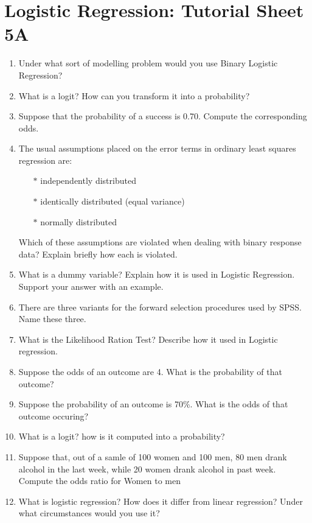 \documentclass[a4paper,12pt]{article}
\begin{document}
	\section*{Logistic Regression: Tutorial Sheet 5A}
\begin{enumerate}
	
	\item 
Under what sort of modelling problem would you use Binary Logistic Regression?

	\item What is a logit? How can you transform it into a probability?
	\item Suppose that the probability of a success is 0.70. Compute the corresponding odds.
	\item The usual assumptions placed on the error terms in ordinary least squares
	regression are:
	\begin{itemize}
		\item[$\ast$] independently distributed
		\item[$\ast$] identically distributed (equal variance)
		\item[$\ast$] normally distributed
	\end{itemize}
	Which of these assumptions are violated when dealing with binary response
	data? Explain briefly how each is violated.
	\item What is a dummy variable? Explain how it is used in Logistic Regression. Support your answer with an example.
	\item There are three variants for the forward selection procedures used by SPSS. Name these three.
	\item What is the Likelihood Ration Test? Describe how it used in Logistic regression.
	\item Suppose the odds of an outcome are 4. What is the probability of that outcome?
	\item Suppose the probability of an outcome is 70\%. What is the odds of that outcome occuring?
	\item What is a logit? how is it computed into a probability?
	\item Suppose that, out of a samle of 100 women and 100 men, 80 men drank alcohol in the last week, while 20 women drank alcohol in past week. Compute the odds ratio for Women to men
	\item What is logistic regression? How does it differ from linear regression? Under what circumstances would you use it?
\end{enumerate}	
\end{document}

